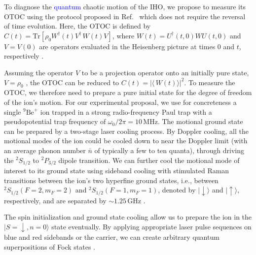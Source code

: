 \documentclass[prl,twocolumn,superscriptaddress,floatfix,showpacs,amsmath,longbibliography,nofootinbib,amssymb]{revtex4-1}
\newcommand{\colb}[1]{\textcolor{blue}{#1}}
\begin{document}
To diagnose the \colb{quantum} chaotic motion of the IHO, we propose to measure its OTOC using the 
protocol proposed in Ref.~\cite{blocher2020measuring} 
which does not require the reversal of time evolution. Here, 
the OTOC is defined by  $C(t)=\mathrm{Tr}[\rho_0W^\dagger(t)V^\dagger\,W(t)V]$, 
where $W(t)=U^\dagger(t, 0)WU(t, 0)$ and $V=V(0)$ are operators evaluated in the
Heisenberg picture at times $0$ and $t$, respectively \cite{1969JETP1200L, bound}. 

Assuming the operator $V$
to be a projection operator onto an initially pure state, $V=\rho_0$  \cite{blocher2020measuring},  the OTOC can be reduced to $C(t)=|\langle\,W(t)\rangle|^2$.
To measure the OTOC, we therefore need 
to prepare a pure initial state for the degree of freedom of the ion's motion. For our 
experimental proposal, we use for concreteness a single $^9\mathrm{Be}^+$ ion trapped in a strong radio-frequency Paul trap with a pseudopotential trap frequency 
of $\omega_0/2\pi=10\,\mathrm{MHz}$. The motional ground state can be prepared 
by a two-stage laser cooling process. By Doppler cooling, all the motional modes of the ion could be cooled down to near the Doppler limit (with an average phonon number $\bar{n}$ of typically a few to ten quanta), through driving the 
$^2S_{1/2}$ to $^2P_{3/2}$ dipole transition. %
We can further cool the motional mode of interest to its ground state using sideband cooling with stimulated Raman transitions between the ion's two hyperfine ground states, i.e., between $^2S_{1/2}(F=2, m_F=2)$ and $^2S_{1/2}(F=1, m_F=1)$, denoted by $|\downarrow\rangle$ and $|\uparrow\rangle$, respectively, and are separated by $\sim1.25\,\mathrm{GHz}$ \cite{PhysRevA.42.2977, PhysRevLett.75.4011}. 

The spin initialization and ground state cooling allow us to prepare the ion in the 
$|S=\downarrow, n=0\rangle$ state eventually. By applying appropriate laser pulse sequences on blue and red sidebands or the carrier, 
we can create  arbitrary quantum superpositions of Fock states \cite{PhysRevA.55.1683, PhysRevA.57.2096, PhysRevLett.90.037902, PhysRevLett.92.113004}. 
\end{document}
